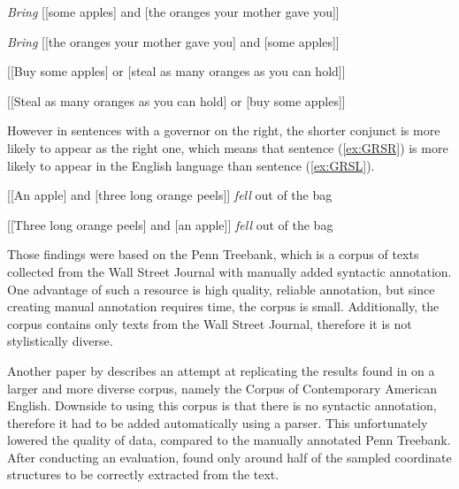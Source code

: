 \begin{exe}

\ex\label{ex:GL}
\begin{xlist}
\ex\label{ex:GLSL}
\textsl{Bring} [[some apples] and [the oranges your mother gave you]]

\ex\label{ex:GLSR}
\textsl{Bring} [[the oranges your mother gave you] and [some apples]]
\end{xlist}

\ex\label{ex:GN}
\begin{xlist}
\ex\label{ex:GNSL}
[[Buy some apples] or [steal as many oranges as you can hold]]

\ex\label{ex:GNSR}
[[Steal as many oranges as you can hold] or [buy some apples]]
\end{xlist}

\end{exe}

However in sentences with a governor on the right, the shorter conjunct is more likely to appear as the right one, which means that sentence (\ref{ex:GRSR}) is more likely to appear in the English language than sentence (\ref{ex:GRSL}).

\begin{exe}

\ex\label{ex:GR}
\begin{xlist}
\ex\label{ex:GRSL}
[[An apple] and [three long orange peels]] \textsl{fell} out of the bag

\ex\label{ex:GRSR}
[[Three long orange peels] and [an apple]] \textsl{fell} out of the bag
\end{xlist}

\end{exe}

Those findings were based on the Penn Treebank, which is a corpus of texts collected from the Wall Street Journal with manually added syntactic annotation. One advantage of such a resource is high quality, reliable annotation, but since creating manual annotation requires time, the corpus is small. Additionally, the corpus contains only texts from the Wall Street Journal, therefore it is not stylistically diverse. 

Another paper by \cite{prz:etal:24} describes an attempt at replicating the results found in \cite{prz:woz:23} on a larger and more diverse corpus, namely the Corpus of Contemporary American English. Downside to using this corpus is that there is no syntactic annotation, therefore it had to be added automatically using a parser. This unfortunately lowered the quality of data, compared to the manually annotated Penn Treebank. After conducting an evaluation, \cite{prz:etal:24} found only around half of the sampled coordinate structures to be correctly extracted from the text. 

